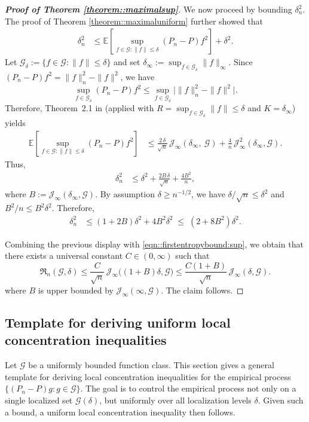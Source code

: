 \documentclass[11pt]{article}
\theoremstyle{plain}
\theoremstyle{definition} %
\begin{document}
\begin{proof}[\textbf{Proof of Theorem \ref{theorem::maximalsup}}]
We now proceed by bounding $\delta_n^2$. The proof of Theorem \ref{theorem::maximaluniform} further showed that
\begin{align*}
\delta_n^2
&\le \mathbb{E}\left[ \sup_{f \in \mathcal{G}: \|f\|\le \delta} (P_n - P) f^2 \right] + \delta^2.
\end{align*}
Let $\mathcal{G}_{\delta}:=\{f\in\mathcal{G}:\|f\|\le \delta\}$ and set $\delta_{\infty} := \sup_{f\in\mathcal{G}_{\delta}}\|f\|_\infty.$
Since $(P_n-P)f^2 = \|f\|_n^2-\|f\|^2$, we have
\[
\sup_{f\in\mathcal{G}_{\delta}}(P_n-P)f^2
\le
\sup_{f\in\mathcal{G}_{\delta}}\bigl|\|f\|_n^2-\|f\|^2\bigr|.
\]
Therefore, Theorem~2.1 in \cite{van2014uniform} (applied with $R=\sup_{f\in\mathcal{G}_{\delta}}\|f\|\le \delta$ and $K = \delta_{\infty}$) yields
\begin{align*}
\mathbb{E}\left[ \sup_{f \in \mathcal{G}: \|f\|\le \delta} (P_n - P) f^2 \right]
&\le
\frac{2\,\delta}{\sqrt{n}}\,\mathcal{J}_\infty\left(\delta_{\infty} ,\ \mathcal{G}\right)
+
\frac{4}{n}\,\mathcal{J}_\infty^2\left(\delta_{\infty} , \mathcal{G}\right).
\end{align*}
Thus,
\begin{align*}
\delta_n^2
&\le \delta^2
+ \frac{2B\,\delta}{\sqrt{n}}
+ \frac{4B^2}{n},
\end{align*}
where \(B := \mathcal{J}_\infty\left(\delta_{\infty}, \mathcal{G}\right)\).
By assumption \(\delta \ge n^{-1/2}\), we have \(\delta/\sqrt{n} \le \delta^2\) and \(B^2/n \le B^2\delta^2\).
Therefore,
\begin{align*}
\delta_n^2
&\le (1+2B)\delta^2 + 4B^2\delta^2
\;\le\; (2+8B^2)\delta^2.
\end{align*}


Combining the previous display with \eqref{eqn::firstentropybound:sup}, we obtain that there exists a universal constant \(C\in(0,\infty)\) such that
\begin{equation*}
\mathfrak{R}_n(\mathcal{G},\delta)
\le \frac{C}{\sqrt{n}}\,\mathcal{J}_\infty\bigl((1+B)\delta,\mathcal{G}\bigr)
\le \frac{C(1+B)}{\sqrt{n}}\,\mathcal{J}_\infty(\delta,\mathcal{G}).
\end{equation*}
where $B$ is upper bounded by $ \mathcal{J}_\infty\left(\infty, \mathcal{G}\right)$. The claim follows.
\end{proof}

 


\subsection{Template for deriving uniform local concentration inequalities}
\label{appendix::localuniform}
Let \(\mathcal{G}\) be a uniformly bounded function class. This section gives a general template for deriving local concentration inequalities for the empirical process \(\{(P_n-P)g : g\in\mathcal{G}\}\). The goal is to control the empirical process not only on a single localized set \(\mathcal{G}(\delta)\), but uniformly over all localization levels \(\delta\). Given such a bound, a uniform local concentration inequality then follows.
\end{document}

